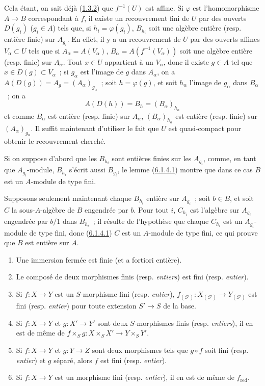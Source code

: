 Cela étant, on sait déjà (\hyperref[II.1.3.2-fr]{1.3.2}) que $f^{-1}(U)$ est
affine. Si $\varphi$ est l'homomorphisme $A\to B$ correspondant à $f$, il
existe un recouvrement fini de $U$ par des ouverts $D(g_i)$ ($g_i\in A$) tels
que, si $h_i=\varphi(g_i)$, $B_{h_i}$ soit une algèbre entière (resp. entière
finie) sur $A_{g_i}$. En effet, il y a un recouvrement de $U$ par des ouverts
affines $V_\alpha\subset U$ tels que si
$A_\alpha=A(V_\alpha)$, $B_\alpha=A(f^{-1}(V_\alpha))$ soit une algèbre
entière (resp. finie) sur $A_\alpha$. Tout $x\in U$ appartient à un
$V_\alpha$, donc il existe $g\in A$ tel que $x\in D(g)\subset V_\alpha$~; si
$g_\alpha$ est l'image de $g$ dans $A_\alpha$, on a
$A(D(g))=A_g=(A_\alpha)_{g_\alpha}$~; soit $h=\varphi(g)$, et soit $h_\alpha$
l'image de $g_\alpha$ dans $B_\alpha$~; on a
\[
A(D(h))=B_h=(B_\alpha)_{h_\alpha}
\]
et comme $B_\alpha$ est entière (resp. finie) sur $A_\alpha$,
$(B_\alpha)_{h_\alpha}$ est entière (resp. finie) sur
$(A_\alpha)_{g_\alpha}$. Il suffit maintenant d'utiliser le fait que $U$ est
quasi-compact pour obtenir le recouvrement cherché.

Si on suppose d'abord que les $B_{h_i}$ sont entières finies sur les
$A_{g_i}$, comme, en tant que $A_{g_i}$-module, $B_{h_i}$ s'écrit aussi
$B_{g_i}$, le lemme (\hyperref[II.6.1.4.1-fr]{6.1.4.1}) montre que dans ce cas
$B$ est un $A$-module de type fini.

Supposons seulement maintenant chaque $B_{h_i}$ entière sur $A_{g_i}$~; soit
$b\in B$, et soit $C$ la sous-$A$-algèbre de $B$ engendrée par $b$. Pour tout
$i$, $C_{h_i}$ est l'algèbre sur $A_{g_i}$ engendrée par $b/1$ dans
$B_{h_i}$~; il résulte de l'hypothèse que chaque $C_{h_i}$ est un
$A_{g_i}$-module de type fini, donc
(\hyperref[II.6.1.4.1-fr]{6.1.4.1}) $C$ est un $A$-module de type fini, ce qui
prouve que $B$ est entière sur $A$.

\begin{proposition}[6.1.5]
\label{II.6.1.5-fr}
\begin{enumerate}
\item[\textup{(i)}] Une immersion fermée est finie (et \textup{a fortiori} entière).
\item[\textup{(ii)}] Le composé de deux morphismes finis \textup{(resp. \emph{entiers})} est fini
\textup{(resp. \emph{entier})}.
\item[\textup{(iii)}] Si $f:X\to Y$ est un $S$-morphisme fini \textup{(resp. \emph{entier})},
$f_{(S')}:X_{(S')}\to Y_{(S')}$ est fini \textup{(resp. \emph{entier})} pour toute extension
$S'\to S$ de la base.
\item[\textup{(iv)}] Si $f:X\to Y$ et $g:X'\to Y'$ sont deux $S$-morphismes finis
\textup{(resp. \emph{entiers})}, il en est de même de
$f\times_S g:X\times_S X'\to Y\times_S Y'$.
\item[\textup{(v)}] Si $f:X\to Y$ et $g:Y\to Z$ sont deux morphismes tels que $g\circ
f$ soit fini \textup{(resp. \emph{entier})} et $g$ séparé, alors $f$ est fini \textup{(resp. \emph{entier})}.
\item[\textup{(vi)}] Si $f:X\to Y$ est un morphisme fini \textup{(resp. \emph{entier})}, il en est de
même de $f_{\mathrm{red}}$.
\end{enumerate}
\end{proposition}

